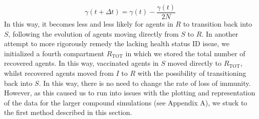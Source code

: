 \begin{equation*}
    \gamma(t+\Delta t) = \gamma(t) - \frac{\gamma(t)}{2N}
\end{equation*}
In this way, it becomes less and less likely for agents in $R$ to transition back into $S$, following the evolution of agents moving directly from $S$ to $R$. In another attempt to more rigorously remedy the lacking health status ID issue, we initialized a fourth compartment $R_\text{TOT}$ in which we stored the total number of recovered agents. In this way, vaccinated agents in $S$ moved directly to $R_\text{TOT}$, whilst recovered agents moved from $I$ to $R$ with the possibility of transitioning back into $S$. In this way, there is no need to change the rate of loss of immunity. However, as this caused us to run into issues with the plotting and representation of the data for the larger compound simulations (see Appendix A), we stuck to the first method described in this section. 